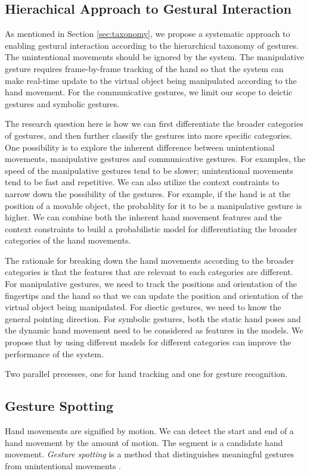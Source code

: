 \subsection{Hierachical Approach to Gestural Interaction}
As mentioned in Section \ref{sec:taxonomy}, we propose a systematic approach to
enabling gestural interaction according to the hierarchical taxonomy of
gestures. The unintentional movements should be ignored by the system. The
manipulative gesture requires frame-by-frame tracking of the hand so that the system can make
real-time update to the virtual object being manipulated according to the hand
movement. For the communicative gestures, we limit our scope to deictic gestures
and symbolic gestures. 

The research question here is how we can first differentiate the broader
categories of gestures, and then further classify the gestures into more 
specific categories. One possibility is to explore the inherent difference
between unintentional movements, manipulative gestures and communicative
gestures. For examples, the speed of the manipulative gestures tend to be
slower; unintentional movements tend to be fast and repetitive. We can also
utilize the context contraints to narrow down the possibility of the gestures.
For example, if the hand is at the position of a movable object, the probablity
for it to be a manipulative gesture is higher. We can combine both the inherent
hand movement features and the context constraints to build a probabilistic
model for differentiating the broader categories of the hand movements.

The rationale for breaking down the hand movements according to the broader
categories is that the features that are relevant to each categories are
different. For manipulative gestures, we need to track the positions and 
orientation of the fingertips and the hand so that we can update the position 
and orientation of the virtual object being manipulated. For diectic gestures, 
we need to know the general pointing direction. For symbolic gestures, both the 
static hand poses and the dynamic hand movement need to be considered as 
features in the models. We propose that by using different models for
different categories can improve the performance of the system. 

Two parallel precesses, one for hand tracking and one for gesture recognition.

\subsection{Gesture Spotting}
Hand movements are signified by motion. We can detect the start
and end of a hand movement by the amount of motion. The segment is a candidate
hand movement. \textit{Gesture spotting} is a method that distinguishes
meaningful gestures from unintentional movements \cite{kang04}.

